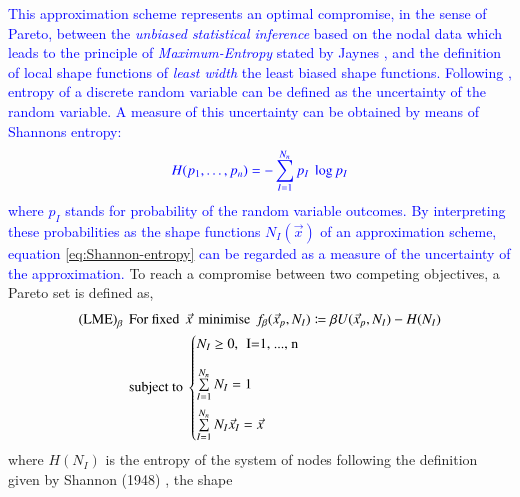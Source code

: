 \documentclass[preprint,12pt,a4paper]{elsarticle}
\begin{document}
\textcolor{blue}{This approximation scheme represents an optimal compromise, in the sense of
Pareto, between the \textit{unbiased statistical inference} based on
the nodal data which leads to the principle of \textit{Maximum-Entropy}
stated by Jaynes \cite{Jaynes1957}, and the definition of local shape
functions of \textit{least width} the least biased shape functions.
Following \cite{Arroyo2006}, entropy of a discrete random variable can be defined as the uncertainty of the random variable. A measure of this uncertainty can be obtained by means of Shannon\textquotesingle s entropy:}
\begin{equation}
  \label{eq:Shannon-entropy}
  \textcolor{blue}{H(p_1,\ldots,p_n) = -\sum^{N_n}_{I=1}{p_I\ \log p_I }}
\end{equation}
\textcolor{blue}{where $p_I$ stands for probability of the random variable outcomes. By interpreting these probabilities as the shape functions $N_I(\vec{x})$ of an approximation scheme, equation \eqref{eq:Shannon-entropy} can be regarded as a measure of the uncertainty of the approximation.} To reach a compromise between two competing objectives, a Pareto set is
defined as,
\begin{align*}
  \label{eq:LME-scheme-pareto-set}
  \text{(LME)}_{\beta} \hspace{0.15cm} &\text{For fixed} \hspace{0.15cm}
                                         \vec{x} \hspace{0.15cm} \text{minimise} \hspace{0.15cm} f_{\beta}(\vec{x}_p, N_I) \coloneqq \beta U(\vec{x}_p,N_I) - H(N_I) \\
                                       &\text{subject to}\
                                         \begin{cases}
                                           N_I \ge 0, \hspace{0.15cm} \text{I=1, ..., n} \\[1em]   
                                           \sum\limits_{I=1}^{N_n}{N_I} = 1 \\[1em]   
                                           \sum\limits_{I=1}^{N_n}{N_I \vec{x}_I} = \vec{x} \\
                                         \end{cases}
\end{align*}            
where $H(N_I)$ is the entropy of the system of nodes following the
definition given by Shannon (1948) \cite{Shannon1948}, the shape
\end{document}
